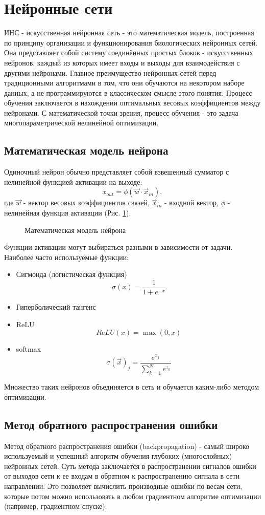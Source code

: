\clearpage
\section{Нейронные сети}
	ИНС - искусственная нейронная сеть - это математическая модель, построенная по принципу организации и функционирования биологических нейронных сетей. Она представляет собой систему соединённых простых блоков - искусственных нейронов, каждый из которых имеет входы и выходы для взаимодействия с другими нейронами. Главное преимущество нейронных сетей перед традиционными алгоритмами в том, что они обучаются на некотором наборе данных, а не программируются в классическом смысле этого понятия. Процесс обучения заключается в нахождении оптимальных весовых коэффициентов между нейронами. С математической точки зрения, процесс обучения - это задача многопараметрической нелинейной оптимизации.
	\subsection{Математическая модель нейрона}
		Одиночный нейрон обычно представляет собой взвешенный сумматор с нелинейной функцией активации на выходе:
		$$x_{out} = \phi(\vec{w} \cdotp \vec{x}_{in}),$$
		где $\vec{w}$ - вектор весовых коэффициентов связей, $\vec{x}_{in}$ - входной вектор, $\phi$ - нелинейная функция активации (Рис. \ref{3-artificial-neuron-model}).
		
		\begin{figure}[h]
			\caption{Математическая модель нейрона}
			\label{3-artificial-neuron-model}
		\end{figure}
		
		Функции активации могут выбираться разными в зависимости от задачи. Наиболее часто используемые функции:
		
		\begin{itemize}
			\item Сигмоида (логистическая функция)
					$$\sigma(x) = \frac{1}{1 + e^{-x}}$$
			\item Гиперболический тангенс
			\item ReLU
					$$ReLU(x) = \max(0, x)$$
			\item softmax
					$$\sigma(\vec{x})_j = \frac{e^{x_j}}{\sum_{k=1}^{N} e^{z_k}}$$
		\end{itemize}
		Множество таких нейронов объединяется в сеть и обучается каким-либо методом оптимизации.
	\subsection{Метод обратного распространения ошибки}
		Метод обратного распространения ошибки (backpropagation) - самый широко используемый и успешный алгоритм обучения глубоких (многослойных) нейронных сетей. Суть метода заключается в распространении сигналов ошибки от выходов сети к ее входам в обратном к распространению сигнала в сети направлении. Это позволяет вычислить производные ошибки по весам сети, которые потом можно использовать в любом градиентном алгоритме оптимизации (например, градиентном спуске).
		
